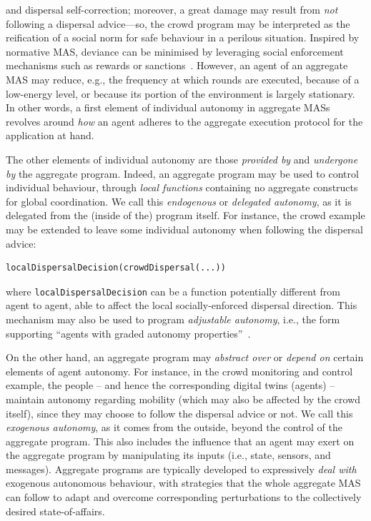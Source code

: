  and dispersal self-correction; moreover, a great damage may result from \emph{not} following a dispersal advice---so, the crowd program may be interpreted as the reification of a social norm for safe behaviour in a perilous situation.
%
Inspired by normative MAS, deviance can be minimised
 by leveraging social enforcement mechanisms
 such as rewards or sanctions~\cite{DBLP:journals/jasss/HollanderW11}.
%
However, an agent of an aggregate MAS may reduce, e.g.,
 the frequency at which rounds are executed,
 because of a low-energy level,
 or because its portion of the environment 
 is largely stationary.
%
In other words,
 a first element of individual autonomy in aggregate MASs
 revolves around \emph{how}
 an agent adheres to the aggregate execution protocol
 for the application at hand.

The other elements of individual autonomy
 are those \emph{provided by} and \emph{undergone by}
 the aggregate program.
%
Indeed, an aggregate program may be used to 
 control individual behaviour,
 through \emph{local functions}
 containing no aggregate constructs for global coordination.
%
We call this \emph{endogenous} or \emph{delegated autonomy},
 as it is delegated from the (inside of the) program itself.
%
For instance, the crowd example may be extended to leave some individual autonomy when following the dispersal advice:
\begin{lstlisting}
localDispersalDecision(crowdDispersal(...))
\end{lstlisting}
%
where \lstinline|localDispersalDecision| can be a function potentially different from agent to agent, able to affect the local socially-enforced dispersal direction.
%
This mechanism may also be used to program \emph{adjustable autonomy}, i.e., the form 
 supporting ``agents with graded autonomy properties''~\cite{DBLP:journals/air/MostafaAM19}.

On the other hand, an aggregate program may \emph{abstract over} or \emph{depend on} certain elements of agent autonomy.
%
For instance, in the crowd monitoring and control example,
 the people -- and hence the corresponding digital twins (agents) --
 maintain autonomy regarding mobility (which may also be affected by the crowd itself), since they may choose to follow the dispersal advice or not.
%
We call this \emph{exogenous autonomy},
 as it comes from the outside,
 beyond the control of the aggregate program.
%
This also includes the influence that an agent
 may exert on the aggregate program
 by manipulating its inputs
 (i.e., state, sensors, and messages).
%
Aggregate programs are typically developed 
 to expressively \emph{deal with} exogenous autonomous behaviour,
 with strategies that the whole aggregate MAS can follow
 to adapt and overcome corresponding perturbations
 to the collectively desired state-of-affairs.
%

